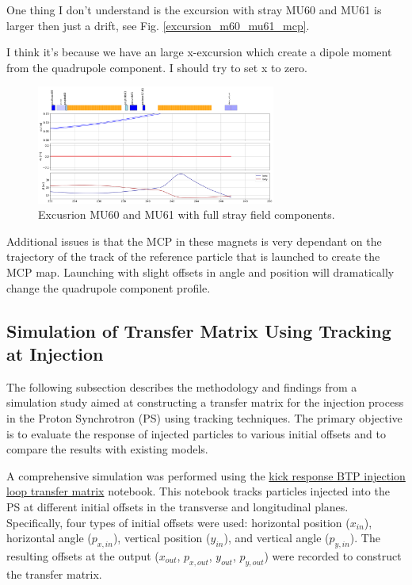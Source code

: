 One thing I don't understand is the excursion with stray MU60 and MU61 is larger then just a drift, see Fig. \ref{excursion_m60_mu61_mcp}. 

I think it's because we have an large x-excursion which create a dipole moment from the quadrupole component. I should try to set x to zero.

\begin{figure}[H]
\centering
\includegraphics[width=0.7\textwidth]{02_Simulation/images/excursion_mu60_mu61_mcp.png}
\caption{Excusrion MU60 and MU61 with full stray field components.}
\label{fig:excursion_m60_mu61_mcp}
\end{figure}

Additional issues is that the MCP in these magnets is very dependant on the trajectory of the track of the reference particle that is launched to create the MCP map. Launching with slight offsets in angle and position will dramatically change the quadrupole component profile.

\subsection{Simulation of Transfer Matrix Using Tracking at Injection}

The following subsection describes the methodology and findings from a simulation study aimed at constructing a transfer matrix for the injection process in the Proton Synchrotron (PS) using tracking techniques. The primary objective is to evaluate the response of injected particles to various initial offsets and to compare the results with existing models.

A comprehensive simulation was performed using the  \href{https://gitlab.cern.ch/eljohnso/acc-models-tls-eliott-fork/-/blob/EliottBranch/ps_injection/kick_response_injection_tracking/kick_response_BTP_injection_loop_transfer_matrix.ipynb}{kick response BTP injection loop transfer matrix} notebook. This notebook tracks particles injected into the PS at different initial offsets in the transverse and longitudinal planes. Specifically, four types of initial offsets were used: horizontal position (\(x_{in}\)), horizontal angle (\(p_{x,in}\)), vertical position (\(y_{in}\)), and vertical angle (\(p_{y,in}\)). The resulting offsets at the output (\(x_{out}\), \(p_{x,out}\), \(y_{out}\), \(p_{y,out}\)) were recorded to construct the transfer matrix.

